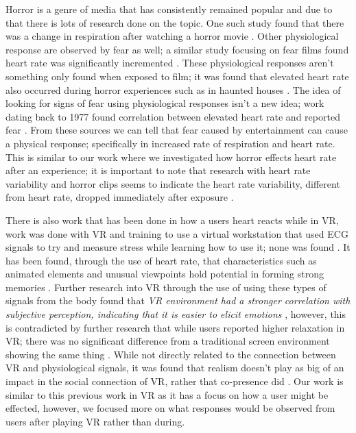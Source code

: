 \documentclass[manuscript,screen,review]{acmart}
\begin{document}
Horror is a genre of media that has consistently remained popular and due to that there is lots of research done on the topic. One such study found that there was a change in respiration after watching a horror movie \cite{Fukumoto15}. Other physiological response are observed by fear as well; a similar study focusing on fear films found heart rate was significantly incremented \cite{Fernandez12}. These physiological responses aren't something only found when exposed to film; it was found that elevated heart rate also occurred during horror experiences such as in haunted houses \cite{Andersen20}. The idea of looking for signs of fear using physiological responses isn't a new idea; work dating back to 1977 found correlation between elevated heart rate and reported fear \cite{Sartory77}. From these sources we can tell that fear caused by entertainment can cause a physical response; specifically in increased rate of respiration and heart rate. This is similar to our work where we investigated how horror effects heart rate after an experience; it is important to note that research with heart rate variability and horror clips seems to indicate the heart rate variability, different from heart rate, dropped immediately after exposure \cite{6993010}.

There is also work that has been done in how a users heart reacts while in VR, work was done with VR and training to use a virtual workstation that used ECG signals to try and measure stress while learning how to use it; none was found \cite{Malinska15}. It has been found, through the use of heart rate, that characteristics such as animated elements and unusual viewpoints hold potential in forming strong memories \cite{Marchiori18}. Further research into VR through the use of using these types of signals from the body found that \textit{VR environment had a stronger correlation with subjective perception, indicating that it is easier to elicit emotions} \cite{niu2019user}, however, this is contradicted by further research that while users reported higher relaxation in VR; there was no significant difference from a traditional screen environment showing the same thing \cite{Knaust22}. While not directly related to the connection between VR and physiological signals, it was found that realism doesn't play as big of an impact in the social connection of VR, rather that co-presence did \cite{bierhuizen2021influence}. Our work is similar to this previous work in VR as it has a focus on how a user might be effected, however, we focused more on what responses would be observed from users after playing VR rather than during.
\end{document}
